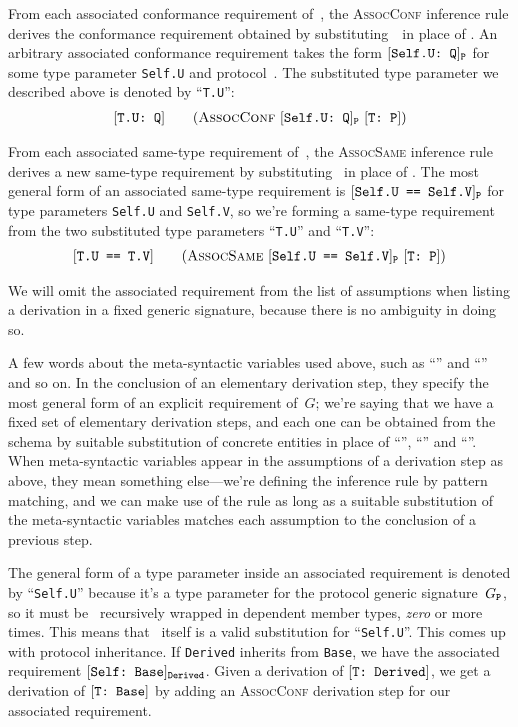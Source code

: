 \documentclass[../generics]{subfiles}
\begin{document}
From each associated conformance requirement of~\tP, the \textsc{AssocConf} inference rule derives the conformance requirement obtained by substituting~\tT\ in place of \IndexSelf \tSelf. An arbitrary associated conformance requirement takes the form $[\texttt{Self.U:~Q}]_{\texttt{P}}$ for some type parameter \texttt{Self.U} and protocol~\tQ. The substituted type parameter we described above is denoted by ``\texttt{T.U}'':
\begin{gather*}
\AssocConfStepDef
\end{gather*}

From each associated same-type requirement of~\tP, the \textsc{AssocSame} inference rule derives a new same-type requirement by substituting \tT\ in place of \tSelf. The most general form of an associated same-type requirement is $[\texttt{Self.U == Self.V}]_{\texttt{P}}$ for type parameters \texttt{Self.U} and \texttt{Self.V}, so we're forming a same-type requirement from the two substituted type parameters ``\texttt{T.U}'' and ``\texttt{T.V}'':
\begin{gather*}
\AssocSameStepDef
\end{gather*}

We will omit the associated requirement from the list of assumptions when listing a derivation in a fixed generic signature, because there is no ambiguity in doing so.

A few words about the meta-syntactic variables used above, such as ``\tT'' and ``\tU'' and so on. In the conclusion of an elementary derivation step, they specify the most general form of an explicit requirement of~$G$; we're saying that we have a fixed set of elementary derivation steps, and each one can be obtained from the schema by suitable substitution of concrete entities in place of ``\tT'', ``\tU'' and ``\tP''. When meta-syntactic variables appear in the assumptions of a derivation step as above, they mean something else---we're defining the inference rule by pattern matching, and we can make use of the rule as long as a suitable substitution of the meta-syntactic variables matches each assumption to the conclusion of a previous step.

The general form of a type parameter inside an associated requirement is denoted by ``\texttt{Self.U}'' because it's a type parameter for the protocol generic signature~$G_{\texttt{P}}$, so it must be \tSelf\ recursively wrapped in dependent member types, \emph{zero} or more times. This means that \tSelf\ itself is a valid substitution for ``\texttt{Self.U}''. This comes up with protocol inheritance. If \texttt{Derived} inherits from \texttt{Base}, we have the associated requirement $[\texttt{Self:~Base}]_{\texttt{Derived}}$. Given a derivation of $[\texttt{T:~Derived}]$, we get a derivation of $[\texttt{T:~Base}]$ by adding an \textsc{AssocConf} derivation step for our associated requirement.
\end{document}
